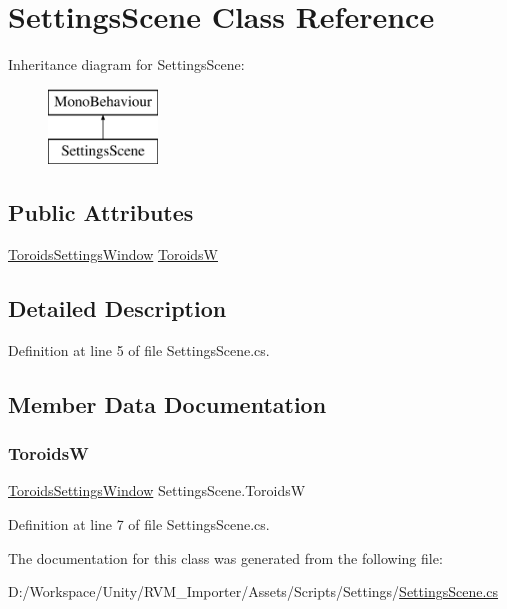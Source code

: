 \hypertarget{class_settings_scene}{}\section{Settings\+Scene Class Reference}
\label{class_settings_scene}
Inheritance diagram for Settings\+Scene\+:\begin{figure}[H]
\begin{center}
\leavevmode
\includegraphics[height=2.000000cm]{class_settings_scene}
\end{center}
\end{figure}
\subsection*{Public Attributes}
\begin{DoxyCompactItemize}
\item 
\mbox{\hyperlink{class_toroids_settings_window}{Toroids\+Settings\+Window}} \mbox{\hyperlink{class_settings_scene_af41a4e4640fdd51b2ce0e0e62190f124}{ToroidsW}}
\end{DoxyCompactItemize}


\subsection{Detailed Description}


Definition at line 5 of file Settings\+Scene.\+cs.



\subsection{Member Data Documentation}
\mbox{\label{class_settings_scene_af41a4e4640fdd51b2ce0e0e62190f124}} 
\subsubsection{\texorpdfstring{ToroidsW}{ToroidsW}}
{\footnotesize\ttfamily \mbox{\hyperlink{class_toroids_settings_window}{Toroids\+Settings\+Window}} Settings\+Scene.\+ToroidsW}



Definition at line 7 of file Settings\+Scene.\+cs.



The documentation for this class was generated from the following file\+:\begin{DoxyCompactItemize}
\item 
D\+:/\+Workspace/\+Unity/\+R\+V\+M\+\_\+\+Importer/\+Assets/\+Scripts/\+Settings/\mbox{\hyperlink{_settings_scene_8cs}{Settings\+Scene.\+cs}}\end{DoxyCompactItemize}
